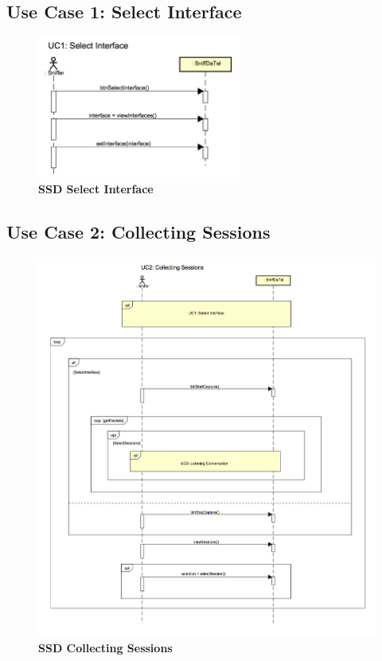 \documentclass[a4,12pt]{scrartcl}
\begin{document}
\subsection{Use Case 1: Select Interface}
\begin{figure} [H]
	\begin{center}
	\includegraphics[width=0.60\textwidth]{./figures/UC1.png}
	\caption{\textbf{SSD Select Interface}}
	\label{Bild Referenz}
	\end{center}
\end{figure}

\subsection{Use Case 2: Collecting Sessions}
\begin{figure} [H]
	\begin{center}
	\includegraphics[width=\textwidth]{./figures/UC2.png}
	\caption{\textbf{SSD Collecting Sessions}}
	\label{Bild Referenz}
	\end{center}
\end{figure}
\end{document}
